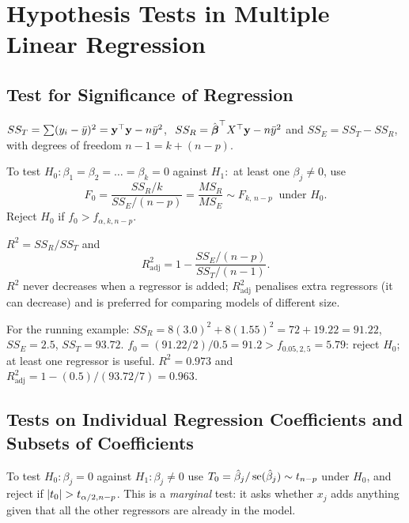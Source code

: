 \section{Hypothesis Tests in Multiple Linear Regression}

\subsection{Test for Significance of Regression}

\begin{definition}
$SS_T=\sum(y_i-\bar{y})^2=\mathbf{y}^{\top}\mathbf{y}-n\bar{y}^2$, $\ SS_R=\hat{\boldsymbol\beta}^{\top} X^{\top}\mathbf{y}-n\bar{y}^2$ and $SS_E=SS_T-SS_R$, with degrees of freedom $n-1=k+(n-p)$.
\end{definition}

\begin{theorem}\label{thm:mlr-F}
To test $H_0:\beta_1=\beta_2=\dots=\beta_k=0$ against $H_1:$ at least one $\beta_j\ne0$, use
\[ F_0=\frac{SS_R/k}{SS_E/(n-p)}=\frac{MS_R}{MS_E}\sim F_{k,\,n-p}\ \text{ under }H_0. \]
Reject $H_0$ if $f_0>f_{\alpha,k,n-p}$.
\end{theorem}

\begin{definition}
$R^2=SS_R/SS_T$ and
\[ R^2_{\mathrm{adj}}=1-\frac{SS_E/(n-p)}{SS_T/(n-1)}. \]
$R^2$ never decreases when a regressor is added; $R^2_{\mathrm{adj}}$ penalises extra regressors (it can decrease) and is preferred for comparing models of different size.
\end{definition}

\begin{example}
For the running example: $SS_R=8(3.0)^2+8(1.55)^2=72+19.22=91.22$, $SS_E=2.5$, $SS_T=93.72$. $f_0=(91.22/2)/0.5=91.2>f_{0.05,2,5}=5.79$: reject $H_0$; at least one regressor is useful. $R^2=0.973$ and $R^2_{\mathrm{adj}}=1-(0.5)/(93.72/7)=0.963$.
\end{example}

\subsection{Tests on Individual Regression Coefficients and Subsets of Coefficients}

\begin{theorem}\label{thm:mlr-t}
To test $H_0:\beta_j=0$ against $H_1:\beta_j\ne0$ use $T_0=\hat\beta_j/\operatorname{se}(\hat\beta_j)\sim t_{n-p}$ under $H_0$, and reject if $\lvert t_0\rvert>t_{\alpha/2,n-p}$. This is a \emph{marginal} test: it asks whether $x_j$ adds anything given that all the other regressors are already in the model.
\end{theorem}

